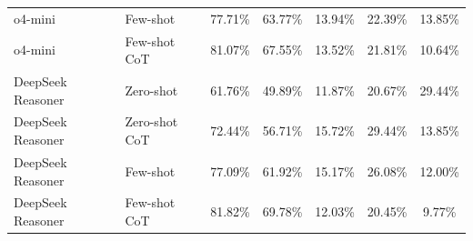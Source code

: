 \begin{table}[pos=htbp]
\begin{tabular}{llccc|c|c}
o4-mini & Few-shot & 77.71\% & 63.77\% & 13.94\% & 22.39\% & 13.85\% \\
o4-mini & Few-shot CoT & 81.07\% & 67.55\% & 13.52\% & 21.81\% & 10.64\% \\
\midrule
DeepSeek Reasoner & Zero-shot & 61.76\% & 49.89\% & 11.87\% & 20.67\% & 29.44\% \\
DeepSeek Reasoner & Zero-shot CoT & 72.44\% & 56.71\% & 15.72\% & 29.44\% & 13.85\% \\
DeepSeek Reasoner & Few-shot & 77.09\% & 61.92\% & 15.17\% & 26.08\% & 12.00\% \\
DeepSeek Reasoner & Few-shot CoT & 81.82\% & 69.78\% & 12.03\% & 20.45\% & 9.77\% \\
\bottomrule
\end{tabular}
\end{table}